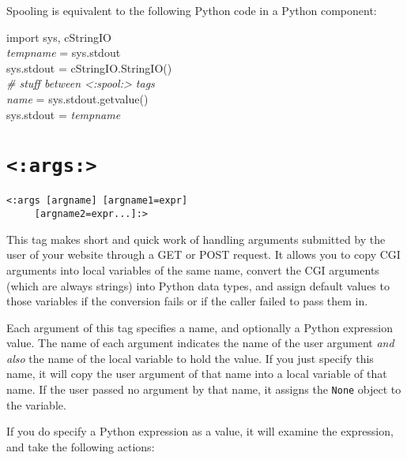 \documentclass{manual}
\begin{document}
Spooling is equivalent to the following Python code in a Python component:
\begin{obeylines}
\ttfamily
import sys, cStringIO
\emph{tempname} = sys.stdout
sys.stdout = cStringIO.StringIO()
\emph{\# stuff between <:spool:> tags }
\emph{name} = sys.stdout.getvalue()
sys.stdout = \emph{tempname}
\end{obeylines}



\section{\texttt{<:args:>}}
\label{tagargs}

\begin{verbatim}
<:args [argname] [argname1=expr] 
     [argname2=expr...]:>
\end{verbatim}


This tag makes short and quick work of handling arguments
submitted by the user of your website through a GET or POST
request. It allows you to copy CGI arguments into local
variables of the same name, convert the CGI arguments (which
are always strings) into Python data types, and assign default 
values to those variables if the conversion fails or if
the caller failed to pass them in.

Each argument of this tag specifies a name, and optionally
a Python expression value. The name of each argument indicates
the name of the user argument \emph{and also} the name of 
the local variable to hold the value. If you just specify this
name, it will copy the user argument of that name
into a local variable of that name. If the user passed no argument
by that name, it assigns the \texttt{None} object
to the variable.

If you do specify a Python expression as a value, it
will examine the expression, and take the following actions:
\end{document}

